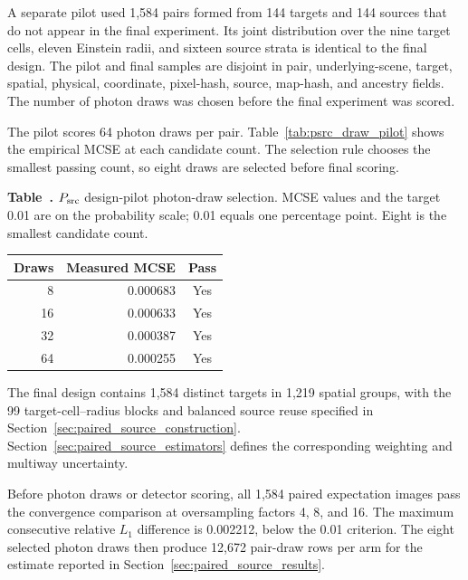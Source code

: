 A separate pilot used 1,584 pairs formed from 144 targets and 144 sources that
do not appear in the final experiment. Its joint distribution over the nine
target cells, eleven Einstein radii, and sixteen source strata is identical to
the final design. The pilot and final samples are disjoint in pair, underlying-scene,
target, spatial, physical, coordinate, pixel-hash, source, map-hash, and
ancestry fields. The number of photon draws was chosen before the final
experiment was scored.

The pilot scores 64 photon draws per pair. Table~\ref{tab:psrc_draw_pilot}
shows the empirical MCSE at each candidate count. The selection
rule chooses the smallest passing count, so eight draws are selected before
final scoring.

\medskip
\noindent\begin{minipage}{\columnwidth}
\label{tab:psrc_draw_pilot}
\noindent\textbf{Table~\thetable.} \(P_{\rm src}\) design-pilot photon-draw
selection. MCSE values and the target 0.01 are on the probability
scale; 0.01 equals one percentage point. Eight is the smallest
candidate count.
\begin{center}
\begin{tabular}{rrc}
\toprule
Draws & Measured MCSE & Pass \\
\midrule
8  & 0.000683 & Yes \\
16 & 0.000633 & Yes \\
32 & 0.000387 & Yes \\
64 & 0.000255 & Yes \\
\bottomrule
\end{tabular}
\end{center}
\end{minipage}


The final design contains 1,584 distinct targets in 1,219 spatial groups,
with the 99 target-cell--radius blocks and balanced source reuse specified in
Section~\ref{sec:paired_source_construction}.
Section~\ref{sec:paired_source_estimators} defines the corresponding weighting
and multiway uncertainty.

Before photon draws or detector scoring, all 1,584 paired expectation images
pass the convergence comparison at oversampling factors 4, 8, and
16. The maximum consecutive relative \(L_1\) difference is 0.002212, below
the 0.01 criterion. The eight selected photon draws then produce 12,672 pair-draw
rows per arm for the estimate reported in
Section~\ref{sec:paired_source_results}.

